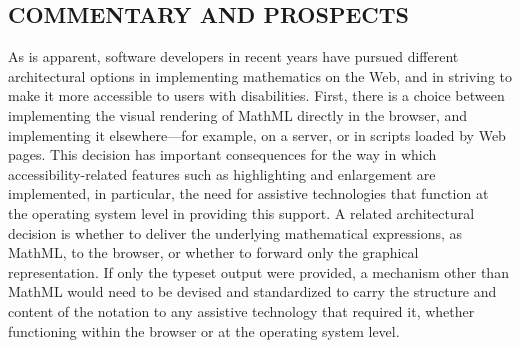 \documentclass[11.5pt]{sig-alternate} %
\begin{document}
\begin{large}
\section*{COMMENTARY AND PROSPECTS}

As is apparent, software developers in recent years have pursued different architectural options in implementing mathematics on the Web, and in striving to make it more accessible to users with disabilities. First, there is a choice between implementing the visual rendering of MathML directly in the browser, and implementing it elsewhere—for example, on a server, or in scripts loaded by Web pages. This decision has important consequences for the way in which accessibility-related features such as highlighting and enlargement are implemented, in particular, the need for assistive technologies that function at the operating system level in providing this support. A related architectural decision is whether to deliver the underlying mathematical expressions, as MathML, to the browser, or whether to forward only the graphical representation. If only the typeset output were provided, a mechanism other than MathML would need to be devised and standardized to carry the structure and content of the notation to any assistive technology that required it, whether functioning within the browser or at the operating system level.


\end{large}
\end{document}
